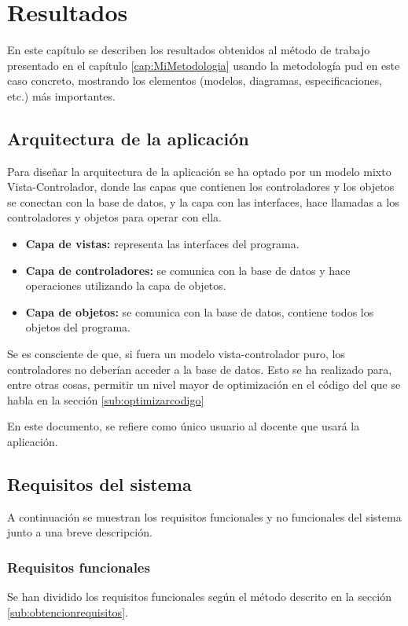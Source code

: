 \chapter{Resultados}
\label{cap:resultados}

En este capítulo se describen los resultados obtenidos al método de trabajo presentado en el capítulo \ref{cap:MiMetodologia} usando la metodología \gls{pud} en este caso concreto, mostrando los elementos (modelos, diagramas, especificaciones, etc.) más importantes.

\section{Arquitectura de la aplicación}
Para diseñar la arquitectura de la aplicación se ha optado por un modelo mixto Vista-Controlador, donde las capas que contienen los controladores y los objetos se conectan con la base de datos, y la capa con las interfaces, hace llamadas a los controladores y objetos para operar con ella.

\begin{itemize}
	\item \textbf{Capa de vistas:} representa las interfaces del programa.
	\item \textbf{Capa de controladores:} se comunica con la base de datos y hace operaciones utilizando la capa de objetos.
	\item \textbf{Capa de objetos:} se comunica con la base de datos, contiene todos los objetos del programa.
\end{itemize}

Se es consciente de que, si fuera un modelo vista-controlador puro, los controladores no deberían acceder a la base de datos. Esto se ha realizado para, entre otras cosas, permitir un nivel mayor de optimización en el código del que se habla en la sección \ref{sub:optimizarcodigo}

En este documento, se refiere como único usuario al docente que usará la aplicación.


\section{Requisitos del sistema}
A continuación se muestran los requisitos funcionales y no funcionales del sistema junto a una breve descripción.

\subsection{Requisitos funcionales}
Se han dividido los requisitos funcionales según el método descrito en la sección \ref{sub:obtencionrequisitos}.

